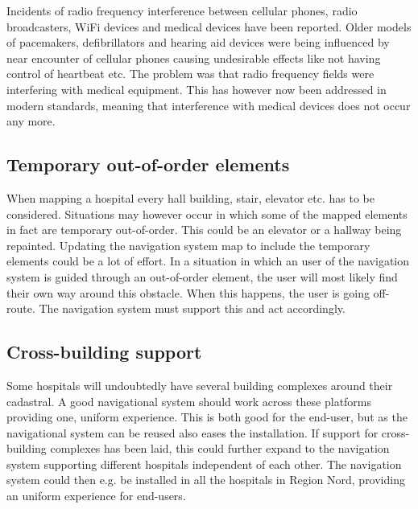 Incidents of radio frequency interference between cellular phones, radio broadcasters, WiFi devices and medical devices have been reported. Older models of pacemakers, defibrillators and hearing aid devices were being influenced by near encounter of cellular phones causing undesirable effects like not having control of heartbeat etc. 
The problem was that radio frequency fields were interfering with medical equipment. This has however now been addressed in modern standards, meaning that interference with medical devices does not occur any more. \cite{Man1998,Case}

\subsection{Temporary out-of-order elements}

When mapping a hospital every hall building, stair, elevator etc. has to be considered. Situations may however occur in which some of the mapped elements in fact are temporary out-of-order. This could be an elevator or a hallway being repainted. Updating the navigation system map to include the temporary elements could be a lot of effort. In a situation in which an user of the navigation system is guided through an out-of-order element, the user will most likely find their own way around this obstacle. When this happens, the user is going off-route. The navigation system must support this and act accordingly.

\subsection{Cross-building support}

Some hospitals will undoubtedly have several building complexes around their cadastral. A good navigational system should work across these platforms providing one, uniform experience. This is both good for the end-user, but as the navigational system can be reused also eases the installation. If support for cross-building complexes has been laid, this could further expand to the navigation system supporting different hospitals independent of each other. The navigation system could then e.g. be installed in all the hospitals in Region Nord, providing an uniform experience for end-users.

